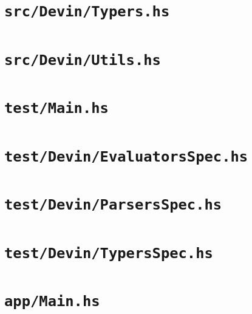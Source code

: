 \documentclass[UdineBachThesis,american,11pt]{PhdThesis}
\begin{document}
  

  \section{\texttt{src/Devin/Typers.hs}}

  

  \section{\texttt{src/Devin/Utils.hs}}

  

  \section{\texttt{test/Main.hs}}

  

  \section{\texttt{test/Devin/EvaluatorsSpec.hs}}

  

  \section{\texttt{test/Devin/ParsersSpec.hs}}

  

  \section{\texttt{test/Devin/TypersSpec.hs}}

  

  \section{\texttt{app/Main.hs}}
  \label{section:app-main-hs}

  
\end{document}
